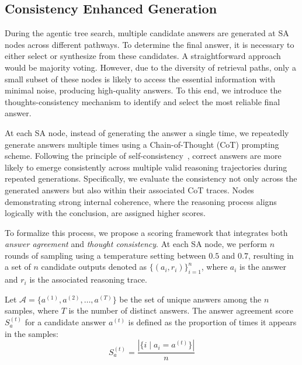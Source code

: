 \subsection{Consistency Enhanced Generation}
\label{subsec:thoughts_consistency}


During the agentic tree search, multiple candidate answers are generated at {SA} nodes across different pathways. To determine the final answer, it is necessary to either select or synthesize from these candidates. A straightforward approach would be majority voting. However, due to the diversity of retrieval paths, only a small subset of these nodes is likely to access the essential information with minimal noise, producing high-quality answers. To this end, we introduce the thoughts-consistency mechanism to identify and select the most reliable final answer.




At each SA node, instead of generating the answer a single time, we repeatedly generate answers multiple times using a Chain-of-Thought (CoT) prompting scheme. Following the principle of self-consistency~\cite{wang2023self}, correct answers are more likely to emerge consistently across multiple valid reasoning trajectories during repeated generations. Specifically, we evaluate the consistency not only across the generated answers but also within their associated CoT traces. Nodes demonstrating strong internal coherence, where the reasoning process aligns logically with the conclusion, are assigned higher scores.


To formalize this process, we propose a scoring framework that integrates both \emph{answer agreement} and \emph{thought consistency}. At each SA node, we perform $n$ rounds of sampling using a temperature setting between $0.5$ and $0.7$, resulting in a set of $n$ candidate outputs denoted as $\{(a_i, r_i)\}_{i=1}^n$, where $a_i$ is the answer and $r_i$ is the associated reasoning trace.

Let $\mathcal{A} = \{a^{(1)}, a^{(2)}, \dots, a^{(T)}\}$ be the set of unique answers among the $n$ samples, where $T$ is the number of distinct answers. The answer agreement score $S_a^{(t)}$ for a candidate answer $a^{(t)}$ is defined as the proportion of times it appears in the samples:
\begin{equation}
S_a^{(t)} = \frac{|\{i \mid a_i = a^{(t)}\}|}{n}
\end{equation}

